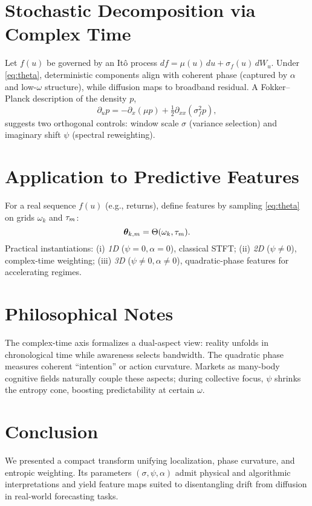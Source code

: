\documentclass[11pt]{article}
\begin{document}
\section{Stochastic Decomposition via Complex Time}
Let $f(u)$ be governed by an It\^o process $df=\mu(u)\,du+\sigma_f(u)\,dW_u$. Under \eqref{eq:theta}, deterministic components align with coherent phase (captured by $\alpha$ and low-$\omega$ structure), while diffusion maps to broadband residual. A Fokker--Planck description of the density $p$,
\begin{equation}
\partial_u p = -\partial_x(\mu p) + \tfrac12 \partial_{xx}(\sigma_f^2 p),
\end{equation}
suggests two orthogonal controls: window scale $\sigma$ (variance selection) and imaginary shift $\psi$ (spectral reweighting).

\section{Application to Predictive Features}
For a real sequence $f(u)$ (e.g., returns), define features by sampling \eqref{eq:theta} on grids $\omega_k$ and $\tau_m$:
\begin{equation}
\bm{\theta}_{k,m}=\Theta(\omega_k,\tau_m).
\end{equation}
Practical instantiations: (i) \emph{1D} ($\psi=0,\alpha=0$), classical STFT; (ii) \emph{2D} ($\psi\neq0$), complex-time weighting; (iii) \emph{3D} ($\psi\neq0, \alpha\neq0$), quadratic-phase features for accelerating regimes.

\section{Philosophical Notes}
The complex-time axis formalizes a dual-aspect view: reality unfolds in chronological time while awareness selects bandwidth. The quadratic phase measures coherent ``intention'' or action curvature. Markets as many-body cognitive fields naturally couple these aspects; during collective focus, $\psi$ shrinks the entropy cone, boosting predictability at certain $\omega$.

\section{Conclusion}
We presented a compact transform unifying localization, phase curvature, and entropic weighting. Its parameters $(\sigma,\psi,\alpha)$ admit physical and algorithmic interpretations and yield feature maps suited to disentangling drift from diffusion in real-world forecasting tasks.



\end{document}
